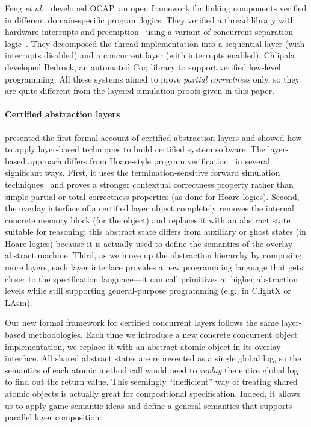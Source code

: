 Feng {\em et al.}~\cite{feng08:vstte} developed OCAP, an open
framework for linking components verified in different
domain-specific program logics. They verified a
thread library with hardware interrupts and
preemption~\cite{feng08:aim} using a variant of concurrent
separation logic~\cite{ohearn:concur04}. They decomposed the thread
implementation into a sequential layer (with interrupts disabled)
and a concurrent layer (with interrupts enabled).
Chlipala~\cite{BedrockPLDI11} developed Bedrock, an automated
Coq library to support verified low-level programming. All these
systems aimed to prove {\em partial correctness} only, so they are
quite different from the layered 
simulation proofs given in this paper.

\paragraph{Certified abstraction layers} \citet{dscal15}
presented the first formal account of certified abstraction layers and
showed how to apply layer-based techniques to build certified system
software. The layer-based approach differs from Hoare-style program
verification~\cite{hoare69,reynolds02,boogie05,nanevski06} in several
significant ways. First, it uses the termination-sensitive forward
simulation techniques~\cite{Lynch95,compcert} and proves a stronger
contextual correctness property rather than simple partial or total
correctness properties (as done for Hoare logics). Second, the overlay
interface of a certified layer object completely removes the internal
concrete memory block (for the object) and replaces it with an
abstract state suitable for reasoning; this abstract state differs
from auxiliary or ghost states (in Hoare logics) because it is
actually used to define the semantics of the overlay abstract machine.
Third, as we move up the abstraction hierarchy by composing more
layers, each layer interface provides a new programming language that gets
closer to the specification language---it can call primitives at
higher abstraction levels while still supporting general-purpose
programming (e.g., in ClightX or LAsm).

Our new formal framework for certified concurrent layers follows the
same layer-based methodologies. Each time we introduce a new concrete
concurrent object implementation, we replace it with an abstract
atomic object in its overlay interface. All shared abstract states are
represented as a single global log, so the semantics of each atomic
method call would need to {\em replay} the entire global log to find
out the return value.  This seemingly ``inefficient'' way of treating
shared atomic objects is actually great for compositional
specification. Indeed, it allows us to apply game-semantic ideas and
define a general semantics that supports parallel layer composition.

